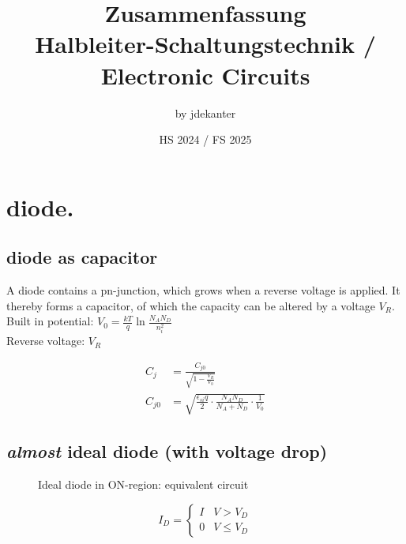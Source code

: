 \documentclass[11ypt]{extarticle}
\begin{document}
\title{Zusammenfassung \\
Halbleiter-Schaltungstechnik / Electronic Circuits}
\author{by jdekanter}
\date{HS 2024 / FS 2025}
\maketitle 

\section{diode.}

\subsection{diode as capacitor}

A diode contains a pn-junction, which grows when a reverse voltage is applied. It thereby forms a capacitor, of which the capacity can be altered by a voltage $V_R$.
\\
Built in potential: $V_0 = \frac{kT}{q} \ln\frac{N_A N_D}{n_i^2}$
\\
Reverse voltage: $V_R$

\begin{equation}
\begin{aligned}
C_{j} &= \frac{C_{j0}}{\sqrt{1-\frac{V_R}{V_0}}}
\\
C_{j0} &= \sqrt{\frac{\epsilon_{si} q}{2} \cdot \frac{N_A N_D}{N_A + N_D} \cdot \frac{1}{V_0}}
\end{aligned}
\end{equation}

\subsection{\textit{almost} ideal diode (with voltage drop)}

\begin{figure}[H]
    \centering
    
    \caption{Ideal diode in ON-region: equivalent circuit}
\end{figure}

\begin{equation}
    I_D = 
    \begin{cases}
        {I} & {V > V_D} \\
        {0} & {V \leq V_D}
    \end{cases}      
\end{equation}
\end{document}
